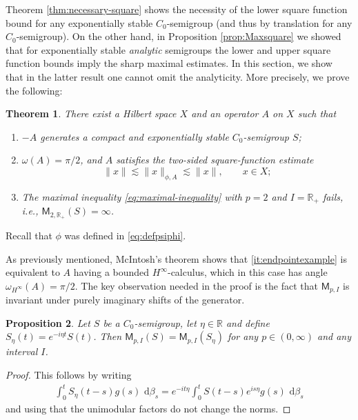 \documentclass[11pt]{amsart}
\newtheorem{theorem}{Theorem}[section]
\newtheorem{proposition}[theorem]{Proposition}
\theoremstyle{definition}
\theoremstyle{remark}
\numberwithin{equation}{section}
\newcommand{\R}{\mathbb R}
\newcommand{\1}{\mathbf 1}
\newcommand{\cM}{\mathsf{M}}
\newcommand{\norm}[1]{\lVert #1\rVert}
\newcommand{\dd}{\,\mathrm d}
\begin{document}
Theorem \ref{thm:necessary-square} shows the necessity of the lower square function bound for any exponentially stable $C_0$-semigroup (and thus by translation for any $C_0$-semigroup). On the other hand, in Proposition \ref{prop:Maxsquare} we showed that for exponentially stable {\em analytic} semigroups the lower and upper square function bounds imply the sharp maximal estimates. In this section, we show that in the latter result one cannot omit the analyticity. 
More precisely, we prove the following:
\begin{theorem}
\label{thm:endpoint-counterexample}
There exist a Hilbert space $X$ and an operator $A$ on
$X$ such that
\begin{enumerate}[label=\textup{(\roman*)}]
\item $-A$ generates a compact and exponentially stable $C_0$-semigroup $S$;
\item\label{it:endpointexample} $\omega(A)=\pi/2$, and $A$ satisfies the two-sided
      square-function estimate
      \begin{equation}
          \label{eq:endpointsqrfunc}
           \norm{x}
           \lesssim \norm{x}_{\phi,A}
           \lesssim \norm{x},
           \qquad x\in X;
        \end{equation}
\item The maximal inequality \eqref{eq:maximal-inequality} with $p = 2$ and $I = \R_+$ fails, i.e., $\cM_{2,\R_+}(S) = \infty$.
\end{enumerate}
\end{theorem}
Recall that $\phi$ was defined in \eqref{eq:defpsiphi}.

As previously mentioned, McIntosh's theorem shows that \ref{it:endpointexample} is equivalent to $A$ having a bounded $H^{\infty}$-calculus, which in this case has angle $\omega_{H^\infty}(A)=\pi/2$.
The key observation needed in the proof is the fact that $\cM_{p,I}$ is invariant under purely imaginary shifts of the generator. 
\begin{proposition}\label{prop:unimodular}
Let $S$ be a $C_0$-semigroup, let $\eta \in \R$ and define $S_{\eta}(t) = e^{-i\eta t}S(t)$.
Then $\cM_{p,I}(S) = \cM_{p,I}(S_{\eta})$ for any $p \in (0,\infty)$ and any interval $I$.
\end{proposition}
\begin{proof}
    This follows by writing 
    \begin{align*}
       \int_0^t S_\eta(t-s)g(s)\,\dd\beta_s =  e^{-it\eta} \int_0^t S(t-s) e^{is\eta}g(s)\,\dd\beta_s 
    \end{align*}
    and using that the unimodular factors do not change the norms.
\end{proof}
\end{document}
